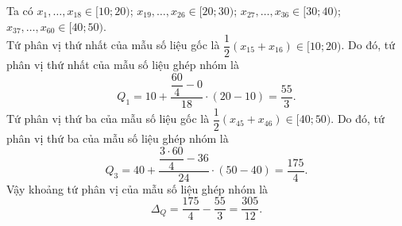 \begin{ex}
{\begin{itemchoice}
			Ta có $x_1,\ldots, x_{18} \in[10;20)$; $x_{19}, \ldots, x_{26} \in[20;30)$; $x_{27}, \ldots, x_{36} \in[30;40)$;\\$x_{37}, \ldots, x_{60} \in[40;50)$.\\
			Tứ phân vị thứ nhất của mẫu số liệu gốc là $\dfrac{1}{2}\left(x_{15}+x_{16}\right) \in[10;20)$. Do đó, tứ phân vị thứ nhất của mẫu số liệu ghép nhóm là
			$$
			Q_1=10+\dfrac{\dfrac{60}{4}-0}{18} \cdot(20-10)=\dfrac{55}{3}.
			$$			
			Tứ phân vị thứ ba của mẫu số liệu gốc là $\dfrac{1}{2}\left(x_{45}+x_{46}\right) \in[40;50)$. Do đó, tứ phân vị thứ ba của mẫu số liệu ghép nhóm là
			$$
			Q_3=40+\dfrac{\dfrac{3\cdot60}{4}-36}{24} \cdot(50-40)=\dfrac{175}{4}.
			$$			
			Vậy khoảng tứ phân vị của mẫu số liệu ghép nhóm là
			$$
			\Delta_Q=\dfrac{175}{4}-\dfrac{55}{3}=\dfrac{305}{12}.
			$$
		\end{itemchoice}
	}
\end{ex}


